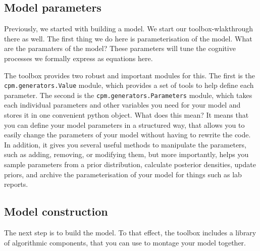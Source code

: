 \documentclass[12pt]{article}
\begin{document}
\subsection{Model parameters}

Previously, we started with building a model. We start our toolbox-wlakthrough there as well. The first thing we do here is parameterisation of the model. What are the paramaters of the model? These parameters will tune the cognitive processes we formally express as equations here.

The toolbox provides two robust and important modules for this. The first is the \texttt{cpm.generators.Value} module, which provides a set of tools to help define each parameter. The second is the \texttt{cpm.generators.Parameters} module, which takes each individual parameters and other variables you need for your model and stores it in one convenient python object. What does this mean? It means that you can define your model parameters in a structured way, that allows you to easily change the parameters of your model without having to rewrite the code. In addition, it gives you several useful methods to manipulate the parameters, such as adding, removing, or modifying them, but more importantly, helps you sample parameters from a prior distribution, calculate posterior densities, update priors, and archive the parameterisation of your model for things such as lab reports.

\subsection{Model construction}

The next step is to build the model. To that effect, the toolbox includes a library of algorithmic components, that you can use to montage your model together.
\end{document}
